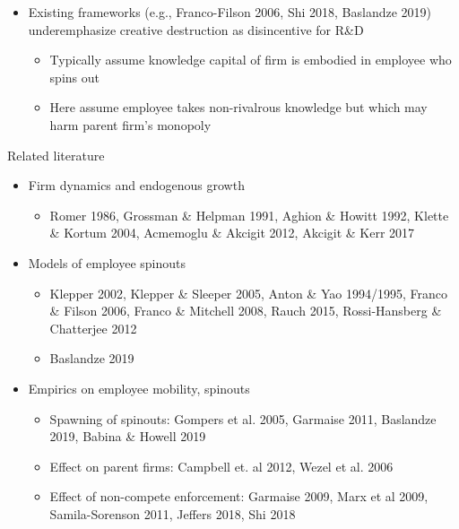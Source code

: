 \documentclass[english,usenames,dvipsnames]{beamer}
\begin{document}
\begin{frame}
\begin{itemize}
	\item Existing frameworks (e.g., Franco-Filson 2006, Shi 2018, Baslandze 2019) underemphasize creative destruction as disincentive for R\&D
	\begin{itemize}
		\item Typically assume knowledge capital of firm is embodied in employee who spins out
		\item Here assume employee takes non-rivalrous knowledge but which may harm parent firm's monopoly
	\end{itemize} 
\end{itemize}
\end{frame}

\begin{frame}{Related literature}
\begin{itemize}
	\item Firm dynamics and endogenous growth
	\begin{itemize}
		\item Romer 1986, Grossman \& Helpman 1991, Aghion \& Howitt 1992, Klette \& Kortum 2004, Acmemoglu \& Akcigit 2012, Akcigit \& Kerr 2017
	\end{itemize}
	\item Models of employee spinouts
	\begin{itemize}
		\item Klepper 2002, Klepper \& Sleeper 2005, Anton \& Yao 1994/1995, Franco \& Filson 2006, Franco \& Mitchell 2008, Rauch 2015, Rossi-Hansberg \& Chatterjee 2012
		\item Baslandze 2019
	\end{itemize}
	\item Empirics on employee mobility, spinouts
	\begin{itemize}
		\item Spawning of spinouts: Gompers et al. 2005, Garmaise 2011, Baslandze 2019, Babina \& Howell 2019
		\item Effect on parent firms: Campbell et. al 2012, Wezel et al. 2006
		\item Effect of non-compete enforcement: Garmaise 2009, Marx et al 2009, Samila-Sorenson 2011, Jeffers 2018, Shi 2018
	\end{itemize}
\end{itemize}
\end{frame}
\end{document}
